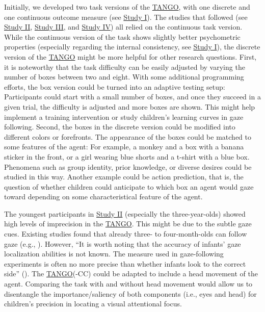 \documentclass[
]{scrbook}
\begin{document}
Initially, we developed two task versions of the \hyperref[acronyms_TANGO]{TANGO}, with one discrete and one continuous outcome measure (see \hyperref[studyI]{Study I}). The studies that followed (see \hyperref[studyII]{Study II}, \hyperref[studyIII]{Study III}, and \hyperref[studyIV]{Study IV}) all relied on the continuous task version. While the continuous version of the task shows slightly better psychometric properties (especially regarding the internal consistency, see \hyperref[studyI]{Study I}), the discrete version of the \hyperref[acronyms_TANGO]{TANGO} might be more helpful for other research questions. First, it is noteworthy that the task difficulty can be easily adjusted by varying the number of boxes between two and eight. With some additional programming efforts, the box version could be turned into an adaptive testing setup: Participants could start with a small number of boxes, and once they succeed in a given trial, the difficulty is adjusted and more boxes are shown. This might help implement a training intervention or study children's learning curves in gaze following. Second, the boxes in the discrete version could be modified into different colors or forefronts. The appearance of the boxes could be matched to some features of the agent: For example, a monkey and a box with a banana sticker in the front, or a girl wearing blue shorts and a t-shirt with a blue box. Phenomena such as group identity, prior knowledge, or diverse desires could be studied in this way. Another example could be action prediction, that is, the question of whether children could anticipate to which box an agent would gaze toward depending on some characteristical feature of the agent.

The youngest participants in \hyperref[studyII]{Study II} (especially the three-year-olds) showed high levels of imprecision in the \hyperref[acronyms_TANGO]{TANGO}. This might be due to the subtle gaze cues. Existing studies found that already three- to four-month-olds can follow gaze (e.g., ). However, ``It is worth noting that the accuracy of infants' gaze localization abilities is not known. The measure used in gaze-following experiments is often no more precise than whether infants look to the correct side'' (). The \hyperref[acronyms_TANGO]{TANGO}(-CC) could be adapted to include a head movement of the agent. Comparing the task with and without head movement would allow us to disentangle the importance/saliency of both components (i.e., eyes and head) for children's precision in locating a visual attentional focus.
\end{document}
